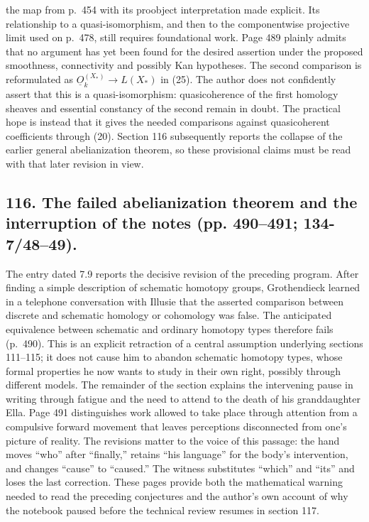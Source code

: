 \documentclass[10pt,oneside]{book}
\begin{document}
the map from p.~454 with its proobject interpretation made explicit. Its relationship to a quasi-isomorphism, and then to the componentwise projective limit used on p.~478, still requires foundational work. Page 489 plainly admits that no argument has yet been found for the desired assertion under the proposed smoothness, connectivity and possibly Kan hypotheses. The second comparison is reformulated as $\underline O_k^{(X_*)}\to L(X_*)$ in (25). The author does not confidently assert that this is a quasi-isomorphism: quasicoherence of the first homology sheaves and essential constancy of the second remain in doubt. The practical hope is instead that it gives the needed comparisons against quasicoherent coefficients through (20). Section 116 subsequently reports the collapse of the earlier general abelianization theorem, so these provisional claims must be read with that later revision in view.

\subsection*{116. The failed abelianization theorem and the interruption of the notes (pp. 490--491; 134-7/48--49).}
The entry dated 7.9 reports the decisive revision of the preceding program. After finding a simple description of schematic homotopy groups, Grothendieck learned in a telephone conversation with Illusie that the asserted comparison between discrete and schematic homology or cohomology was false. The anticipated equivalence between schematic and ordinary homotopy types therefore fails (p.~490). This is an explicit retraction of a central assumption underlying sections 111--115; it does not cause him to abandon schematic homotopy types, whose formal properties he now wants to study in their own right, possibly through different models. The remainder of the section explains the intervening pause in writing through fatigue and the need to attend to the death of his granddaughter Ella. Page 491 distinguishes work allowed to take place through attention from a compulsive forward movement that leaves perceptions disconnected from one's picture of reality. The revisions matter to the voice of this passage: the hand moves ``who'' after ``finally,'' retains ``his language'' for the body's intervention, and changes ``cause'' to ``caused.'' The witness substitutes ``which'' and ``its'' and loses the last correction. These pages provide both the mathematical warning needed to read the preceding conjectures and the author's own account of why the notebook paused before the technical review resumes in section 117.
\end{document}
